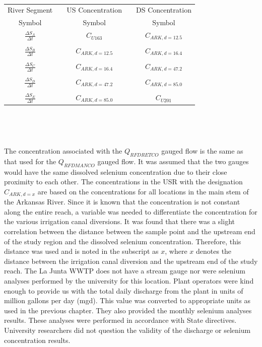 \begin{linenumbers}
\begin{table}[htbp]
\begin{subtable}{\textwidth}
	\end{subtable}\\
	\tablevspace
	\begin{subtable}{\textwidth}
		\centering
		\begin{tabular}{c c c c c} 
			\toprule  
			River Segment & & US Concentration & & DS Concentration\\
			Symbol & & Symbol & & Symbol\\
			\toprule 
			$ \displaystyle \frac{\Delta S_A}{\Delta t} $ & & $ C_{U163} $ & & $ C_{ARK,d=12.5} $\\ \\
			$ \displaystyle \frac{\Delta S_B}{\Delta t} $ & & $ C_{ARK,d=12.5} $ & & $ C_{ARK,d=16.4} $\\ \\
			$ \displaystyle \frac{\Delta S_C}{\Delta t} $ & & $ C_{ARK,d=16.4} $ & & $ C_{ARK,d=47.2} $\\ \\
			$ \displaystyle \frac{\Delta S_D}{\Delta t} $ & & $ C_{ARK,d=47.2} $ & & $ C_{ARK,d=85.0} $\\ \\
			$ \displaystyle \frac{\Delta S_E}{\Delta t} $ & & $ C_{ARK,d=85.0} $ & & $ C_{U201} $\\
			\bottomrule
		\end{tabular} \\
	\end{subtable}\\
\end{table}

The concentration associated with the $ Q_{RFDRETCO} $ gauged flow is the same as that used for the $ Q_{RFDMANCO} $ gauged flow.  It was assumed that the two gauges would have the same dissolved selenium concentration due to their close proximity to each other.  The concentrations in the USR with the designation $ C_{ARK,d=x} $ are based on the concentrations for all locations in the main stem of the Arkansas River.  Since it is known that the concentration is not constant along the entire reach, a variable was needed to differentiate the concentration for the various irrigation canal diversions.  It was found that there was a slight correlation between the distance between the sample point and the upstream end of the study region and the dissolved selenium concentration.  Therefore, this distance was used and is noted in the subscript as $ x $, where $ x $ denotes the distance between the irrigation canal diversion and the upstream end of the study reach.  The La Junta WWTP does not have a stream gauge nor were selenium analyses performed by the university for this location.  Plant operators were kind enough to provide us with the total daily discharge from the plant in units of million gallons per day (mgd).  This value was converted to appropriate units as used in the previous chapter.  They also provided the monthly selenium analyses results.  These analyses were performed in accordance with State directives.  University researchers did not question the validity of the discharge or selenium concentration results.


\end{linenumbers}
